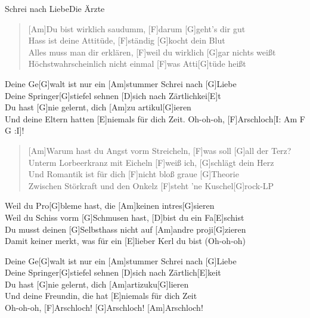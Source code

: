 \begin{song}{Schrei nach Liebe}{Die Ärzte}

    \begin{verse}  
        [Am]Du bist wirklich saudumm, [F]darum [G]geht's dir gut \\
        [Am]Hass ist deine Attitüde, [F]ständig [G]kocht dein Blut \\
        [Am]Alles muss man dir erklären, [F]weil du wirklich [G]gar nichts weißt \\
        [Am]Höchstwahrscheinlich nicht einmal [F]was Atti[G]tüde heißt
    \end{verse}  

    \begin{chorus}
        [F]Deine Ge[G]walt ist nur ein [Am]stummer Schrei nach [G]Liebe \\
        [F]Deine Springer[G]stiefel sehnen [D]sich nach Zärtlichkei[E]t \\
        [F]Du hast [G]nie gelernt, dich [Am]zu artikul[G]ieren \\
        [F]Und deine Eltern hatten [E]niemals für dich Zeit. Oh-oh-oh, [F]Arschloch[I: Am F G :I]!
    \end{chorus}

    \begin{verse}  
        [Am]Warum hast du Angst vorm Streicheln, [F]was soll [G]all der Terz? \\
        [Am]Unterm Lorbeerkranz mit Eicheln [F]weiß ich, [G]schlägt dein Herz \\
        [Am]Und Romantik ist für dich [F]nicht bloß graue [G]Theorie \\
        [Am]Zwischen Störkraft und den Onkelz [F]steht 'ne Kuschel[G]rock-LP
    \end{verse}  

    \begin{bridge}
        [F]Weil du Pro[G]bleme hast, die [Am]keinen intres[G]sieren \\
        [F]Weil du Schiss vorm [G]Schmusen hast, [D]bist du ein Fa[E]schist \\
        [F]Du musst deinen [G]Selbsthass nicht auf [Am]andre proji[G]zieren \\
        [F]Damit keiner merkt, was für ein [E]lieber Kerl du bist (Oh-oh-oh)
    \end{bridge}

    \begin{chorus}  
        [F]Deine Ge[G]walt ist nur ein [Am]stummer Schrei nach [G]Liebe \\
        [F]Deine Springer[G]stiefel sehnen [D]sich nach Zärtlich[E]keit \\
        [F]Du hast [G]nie gelernt, dich [Am]artizuku[G]lieren \\
        [F]Und deine Freundin, die hat [E]niemals für dich Zeit \\
        Oh-oh-oh, [F]Arschloch! [G]Arschloch! [Am]Arschloch!
    \end{chorus}  

    \begin{outro}  
        [F G Am G F G D E  F G Am G F E]
    \end{outro}  

\end{song}
